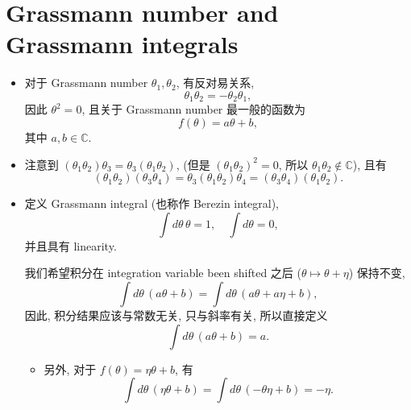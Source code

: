 \section{Grassmann number and Grassmann integrals} \label{Gaussian integrals and Gaussian-Berezin integrals.2}
\begin{itemize}
	\item 对于 Grassmann number $\theta_1, \theta_2$, 有反对易关系,
	\begin{equation}
		\theta_1 \theta_2 = - \theta_2 \theta_1,
	\end{equation}
	因此 $\theta^2 = 0$, 且关于 Grassmann number 最一般的函数为
	\begin{equation}
		f(\theta) = a \theta + b,
	\end{equation}
	其中 $a, b \in \mathbb{C}$.
	
	\item 注意到 $(\theta_1 \theta_2) \theta_3 = \theta_3 (\theta_1 \theta_2)$, (但是 $(\theta_1 \theta_2)^2 = 0$, 所以 $\theta_1 \theta_2 \notin \mathbb{C}$), 且有
	\begin{equation}
		(\theta_1 \theta_2) (\theta_3 \theta_4) = \theta_3 (\theta_1 \theta_2) \theta_4 = (\theta_3 \theta_4) (\theta_1 \theta_2).
	\end{equation}
	
	\item 定义 Grassmann integral (也称作 Berezin integral),
	\begin{equation}
		\int d\theta \, \theta = 1, \quad \int d\theta = 0,
	\end{equation}
	并且具有 linearity.
	
	\begin{tcolorbox}[title=comment:]
		我们希望积分在 integration variable been shifted 之后 ($\theta \mapsto \theta + \eta$) 保持不变,
		\begin{equation}
			\int d\theta \, (a \theta + b) = \int d\theta \, (a \theta + a \eta + b),
		\end{equation}
		因此, 积分结果应该与常数无关, 只与斜率有关, 所以直接定义
		\begin{equation}
			\int d\theta \, (a \theta + b) = a.
		\end{equation}
	\end{tcolorbox}
	
	\begin{itemize}
		\item 另外, 对于 $f(\theta) = \eta \theta + b$, 有
		\begin{equation}
			\int d\theta \, (\eta \theta + b) = \int d\theta \, (- \theta \eta + b) = - \eta.
		\end{equation}
	\end{itemize}
\end{itemize}

